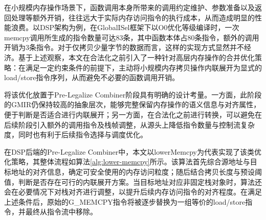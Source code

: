 \par

在小规模内存操作场景下，函数调用本身所带来的调用约定维护、参数准备以及返回处理等额外开销，往往远大于实际内存访问指令的执行成本，从而造成明显的性能浪费。以DSP架构为例，在GlobalISel框架下以O0优化等级编译时，一次memcpy调用所生成的指令数量可达83条，其中函数本体占80条指令，额外的调用开销为3条指令。对于仅拷贝少量字节的数据而言，这样的实现方式显然并不经济。基于上述观察，本文在合法化之前引入了一种针对高层内存操作的合并优化策略：在满足一定约束条件的前提下，主动将小规模内存拷贝操作内联展开为显式的load/store指令序列，从而避免不必要的函数调用开销。

\par

将该优化放置于Pre-Legalize Combiner阶段具有明确的设计考量。一方面，此阶段的GMIR仍保持较高的抽象层次，能够完整保留内存操作的语义信息与对齐属性，便于判断是否适合进行内联展开；另一方面，在合法化之前进行转换，可以避免在后续阶段引入额外的调用指令及栈帧调整，从源头上降低指令数量与控制流复杂度，同时也有利于后续指令选择与调度优化。

\par

在DSP后端的Pre-Legalize Combiner中，本文以lowerMemcpy为代表实现了该类优化策略，其整体流程如算法\ref{alg:lower-memcpy}所示。该算法首先综合源地址与目标地址的对齐信息，确定可安全使用的内存访问粒度；随后结合拷贝长度与预设阈值，判断是否存在可行的内联展开方案。当目标地址对应非固定栈对象时，算法还会在必要情况下对栈对齐进行调整，以提升后续内存访问指令的对齐程度。在满足上述条件后，原始的G\_MEMCPY指令将被逐步替换为一组等价的load/store指令，并最终从指令流中移除。

